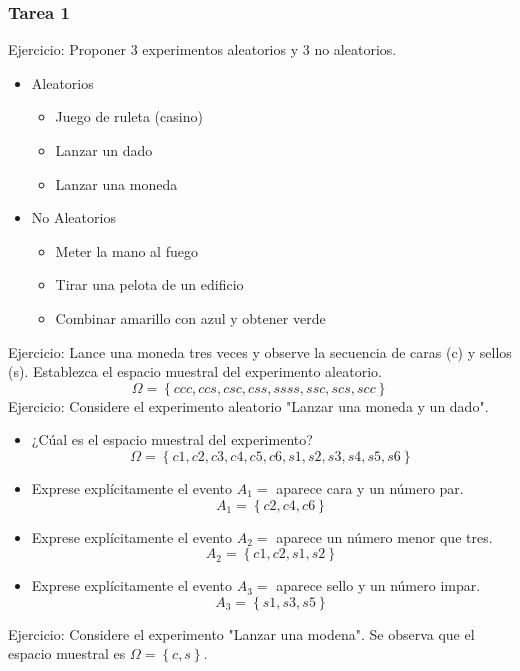 \documentclass[11pt,fleqn]{book} %
\numberwithin{equation}{section} %
\numberwithin{figure}{section} %
\numberwithin{table}{section} %
\begin{document}
\subsubsection{Tarea 1}
Ejercicio: Proponer 3 experimentos aleatorios y 3 no aleatorios.
\begin{itemize}
    \item Aleatorios
    \begin{itemize}
        \item Juego de ruleta (casino)
        \item Lanzar un dado
        \item Lanzar una moneda
    \end{itemize}
    \item No Aleatorios
    \begin{itemize}
        \item Meter la mano al fuego
        \item Tirar una pelota de un edificio
        \item Combinar amarillo con azul y obtener verde
    \end{itemize}
\end{itemize}
Ejercicio: Lance una moneda tres veces y observe la secuencia de caras (c) y sellos (s). Establezca el espacio muestral del experimento aleatorio.
$$ \Omega = \left\{ ccc,ccs,csc,css,ssss,ssc,scs,scc\right\} $$
Ejercicio: Considere el experimento aleatorio "Lanzar una moneda y un dado".
\begin{itemize}
    \item ¿Cúal es el espacio muestral del experimento?
    $$ \Omega = \left\{ c1,c2,c3,c4,c5,c6,s1,s2,s3,s4,s5,s6 \right\} $$
    \item Exprese explícitamente el evento $A_{1} = $ aparece cara y un número par.
    $$ A_{1} = \left\{ c2,c4,c6 \right\} $$
    \item Exprese explícitamente el evento $A_{2} = $ aparece un número menor que tres.
    $$ A_{2} = \left\{ c1,c2,s1,s2 \right\} $$
    \item Exprese explícitamente el evento $A_{3} = $ aparece sello y un número impar.
    $$ A_{3} = \left\{ s1,s3,s5 \right\} $$
\end{itemize}
Ejercicio: Considere el experimento "Lanzar una modena". Se observa que el espacio muestral es  $ \Omega = \left\{ c,s \right\}$.
\end{document}
